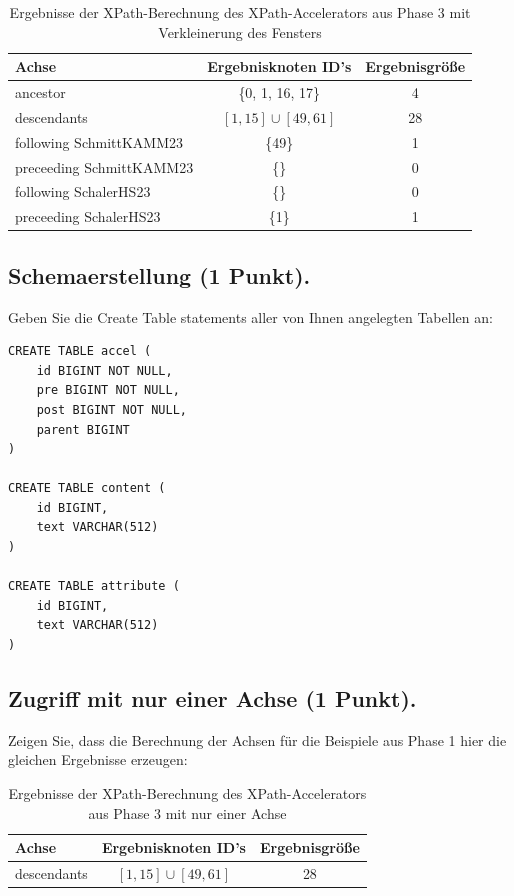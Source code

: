 \documentclass[11pt]{scrartcl}
\begin{document}
\begin{table}[h]
	\centering
	\begin{center}
		\begin{tabular}{ l | c c }
			\toprule
			Achse                    & Ergebnisknoten ID's     & Ergebnisgröße \\
			\midrule
			ancestor                 & \{0, 1, 16, 17\}        & 4             \\
			descendants              & $[1, 15] \cup [49, 61]$ & 28            \\
			following SchmittKAMM23  & \{49\}                  & 1             \\
			preceeding SchmittKAMM23 & \{\}                    & 0             \\
			following SchalerHS23    & \{\}                    & 0             \\
			preceeding SchalerHS23   & \{1\}                   & 1             \\
			\bottomrule
		\end{tabular}
	\end{center}
	\caption{Ergebnisse der XPath-Berechnung des XPath-Accelerators aus Phase 3 mit Verkleinerung des Fensters}
	\label{tab:ErgebnisseDerXPathBerechnungReducedPhase3}
\end{table}



\subsection*{Schemaerstellung (1 Punkt).}
Geben Sie die Create Table statements aller von Ihnen angelegten Tabellen an:
\begin{lstlisting}[style=dmrsql]
CREATE TABLE accel (
    id BIGINT NOT NULL,
    pre BIGINT NOT NULL,
    post BIGINT NOT NULL,
    parent BIGINT
)

CREATE TABLE content (
    id BIGINT,
    text VARCHAR(512)
)

CREATE TABLE attribute (
    id BIGINT,
    text VARCHAR(512)
)
\end{lstlisting}

\subsection*{Zugriff mit nur einer Achse (1 Punkt).}
Zeigen Sie, dass die Berechnung der Achsen für die Beispiele aus Phase 1 hier die gleichen Ergebnisse erzeugen:

\begin{table}[h]
	\centering
	\begin{center}
		\begin{tabular}{ l | c c }
			\toprule
			Achse       & Ergebnisknoten ID's     & Ergebnisgröße \\
			\midrule
			descendants & $[1, 15] \cup [49, 61]$ & 28            \\
			\bottomrule
		\end{tabular}
	\end{center}
	\caption{Ergebnisse der XPath-Berechnung des XPath-Accelerators aus Phase 3 mit nur einer Achse}
	\label{tab:ErgebnisseDerXPathBerechnungOneAxisPhase3}
\end{table}
\end{document}
